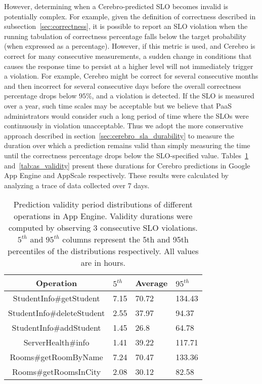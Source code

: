 However, determining when a Cerebro-predicted SLO becomes invalid is
potentially complex. For example, given the definition of correctness
described in subsection~\ref{sec:correctness}, it is possible to report an SLO violation
when the running tabulation of correctness percentage falls below the target
probability (when expressed as a percentage).  However, if this metric is
used, and Cerebro is correct for many consecutive measurements, a sudden
change in conditions that causes the response time to persist at a higher
level will not immediately trigger a violation.  For example, Cerebro might be
correct for several consecutive months and then incorrect for several
consecutive days before the overall correctness percentage drops below $95\%$,
and a violation is detected.  If the SLO is measured over a year, such time
scales may be acceptable but we believe that PaaS administrators would
consider such a long period of time where the SLOs were continuously in
violation unacceptable.
Thus we adopt the more conservative approach described in 
section~\ref{sec:cerebro_sla_durability} to measure the duration over
which a prediction remains valid than simply measuring the time until the
correctness percentage drops below the SLO-specified value.
Tables~\ref{tab:gae_validity} and~\ref{tab:as_validity} present these durations
for Cerebro predictions in Google App Engine and AppScale
respectively. These results were calculated by analyzing a trace of
data collected over 7 days.

\begin{table}
\caption{Prediction validity period distributions of different operations in
App Engine. Validity durations were computed by observing $3$ consecutive SLO
violations. $5^{th}$ and $95^{th}$ columns represent the 5th and 95th 
percentiles of the
distributions respectively. All values are in hours.
\label{tab:gae_validity}
}
\begin{center}
\begin{tabular}{|c|p{2cm}|p{2cm}|p{2cm}|}
\hline
Operation & $5^{th}$ & Average & $95^{th}$ \\ \hline
StudentInfo\#getStudent & 7.15 & 70.72 & 134.43 \\ \hline
StudentInfo\#deleteStudent & 2.55 & 37.97 & 94.37 \\ \hline
StudentInfo\#addStudent & 1.45 & 26.8 & 64.78 \\ \hline
ServerHealth\#info & 1.41 & 39.22 & 117.71 \\ \hline
Rooms\#getRoomByName & 7.24 & 70.47 & 133.36 \\ \hline
Rooms\#getRoomsInCity & 2.08 & 30.12 & 82.58 \\ \hline
\end{tabular}
\end{center}
\end{table}

